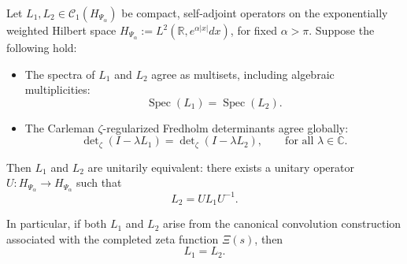 \begin{proposition}
\label{prop:inverse-spectral-rigidity}
Let \( L_1, L_2 \in \mathcal{C}_1(H_{\Psi_\alpha}) \) be compact, self-adjoint operators on the exponentially weighted Hilbert space \( H_{\Psi_\alpha} := L^2(\mathbb{R}, e^{\alpha |x|} dx) \), for fixed \( \alpha > \pi \). Suppose the following hold:
\begin{itemize}
  \item The spectra of \( L_1 \) and \( L_2 \) agree as multisets, including algebraic multiplicities:
  \[
  \operatorname{Spec}(L_1) = \operatorname{Spec}(L_2).
  \]

  \item The Carleman \(\zeta\)-regularized Fredholm determinants agree globally:
  \[
  \det\nolimits_\zeta(I - \lambda L_1) = \det\nolimits_\zeta(I - \lambda L_2), \qquad \text{for all } \lambda \in \mathbb{C}.
  \]
\end{itemize}

Then \( L_1 \) and \( L_2 \) are unitarily equivalent: there exists a unitary operator \( U : H_{\Psi_\alpha} \to H_{\Psi_\alpha} \) such that
\[
L_2 = U L_1 U^{-1}.
\]

\medskip
\noindent
In particular, if both \( L_1 \) and \( L_2 \) arise from the canonical convolution construction associated with the completed zeta function \( \Xi(s) \), then
\[
L_1 = L_2.
\]
\end{proposition}
